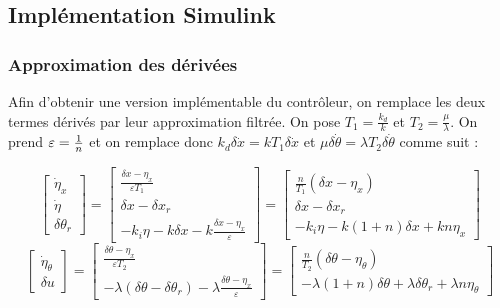 \documentclass[10pt]{article}
\begin{document}

\subsection*{Implémentation Simulink}

\subsubsection*{Approximation des dérivées}

\noindent Afin d'obtenir une version implémentable du contrôleur, on remplace les deux termes dérivés par
leur approximation filtrée. On pose $T_1 =\frac{k_d}{k}$ et $T_2 = \frac{\mu}{\lambda}$. On prend $\varepsilon = \frac{1}{n}$
et on remplace donc $k_d \delta \dot x = k T_1 \delta \dot x$ et
$\mu \delta \dot \theta = \lambda T_2 \delta \dot \theta$ comme suit :

\[
	\begin{bmatrix}
		\dot \eta_x \\
		\dot \eta \\
		\delta \theta_r
	\end{bmatrix}
	= \begin{bmatrix}
		\frac{\delta x - \eta_x}{\varepsilon T_1} \\
		\delta x - \delta x_r \\
		- k_i \eta - k \delta x - k \frac{\delta x - \eta_x}{\varepsilon}
	\end{bmatrix}
	= \begin{bmatrix}
		\frac{n}{T_1} ( \delta x - \eta_x ) \\
		\delta x - \delta x_r \\
		- k_i \eta - k (1 + n) \delta x + k n \eta_x
	\end{bmatrix}
\]
\[
	\begin{bmatrix}
		\dot \eta_\theta \\
		\delta u
	\end{bmatrix}
	= \begin{bmatrix}
		\frac{\delta \theta - \eta_x}{\varepsilon T_2} \\
		- \lambda ( \delta \theta - \delta \theta_r ) - \lambda \frac{\delta \theta - \eta_x}{\varepsilon}
	\end{bmatrix}
	= \begin{bmatrix}
		\frac{n}{T_2} ( \delta \theta - \eta_\theta ) \\
		- \lambda ( 1 + n ) \delta \theta + \lambda \delta \theta_r + \lambda n \eta_\theta
	\end{bmatrix}
\]
\end{document}
